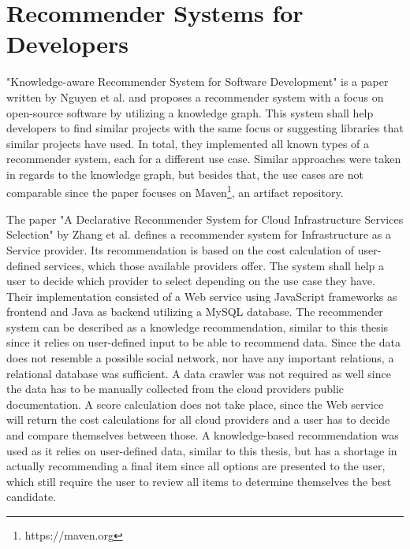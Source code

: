 \section{Recommender Systems for Developers}
\label{sec:rsfd}
"Knowledge-aware Recommender System for Software Development" \cite{Nguyen2018KnowledgeawareRS} is a paper written by Nguyen et al. and proposes a recommender system with a focus on open-source software by utilizing a knowledge graph. This system shall help developers to find similar projects with the same focus or suggesting libraries that similar projects have used. In total, they implemented all known types of a recommender system, each for a different use case. Similar approaches were taken in regards to the knowledge graph, but besides that, the use cases are not comparable since the paper focuses on Maven\footnote{https://maven.org}, an artifact repository.

The paper "A Declarative Recommender System for Cloud Infrastructure Services Selection" \cite{costcalculatorcloud} by Zhang et al. defines a recommender system for Infrastructure as a Service provider. Its recommendation is based on the cost calculation of user-defined services, which those available providers offer. The system shall help a user to decide which provider to select depending on the use case they have. Their implementation consisted of a Web service using JavaScript frameworks as frontend and Java as backend utilizing a MySQL database. The recommender system can be described as a knowledge recommendation, similar to this thesis since it relies on user-defined input to be able to recommend data. Since the data does not resemble a possible social network, nor have any important relations, a relational database was sufficient. A data crawler was not required as well since the data has to be manually collected from the cloud providers public documentation. A score calculation does not take place, since the Web service will return the cost calculations for all cloud providers and a user has to decide and compare themselves between those. A knowledge-based recommendation was used as it relies on user-defined data, similar to this thesis, but has a shortage in actually recommending a final item since all options are presented to the user, which still require the user to review all items to determine themselves the best candidate.